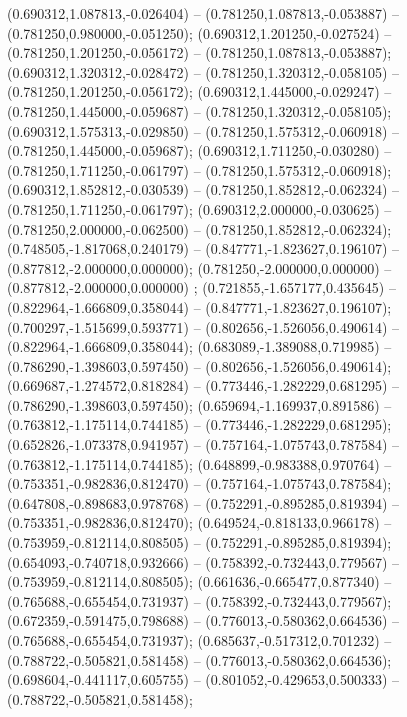  (0.690312,1.087813,-0.026404) -- (0.781250,1.087813,-0.053887) -- (0.781250,0.980000,-0.051250);
 (0.690312,1.201250,-0.027524) -- (0.781250,1.201250,-0.056172) -- (0.781250,1.087813,-0.053887);
 (0.690312,1.320312,-0.028472) -- (0.781250,1.320312,-0.058105) -- (0.781250,1.201250,-0.056172);
 (0.690312,1.445000,-0.029247) -- (0.781250,1.445000,-0.059687) -- (0.781250,1.320312,-0.058105);
 (0.690312,1.575313,-0.029850) -- (0.781250,1.575312,-0.060918) -- (0.781250,1.445000,-0.059687);
 (0.690312,1.711250,-0.030280) -- (0.781250,1.711250,-0.061797) -- (0.781250,1.575312,-0.060918);
 (0.690312,1.852812,-0.030539) -- (0.781250,1.852812,-0.062324) -- (0.781250,1.711250,-0.061797);
 (0.690312,2.000000,-0.030625) -- (0.781250,2.000000,-0.062500) -- (0.781250,1.852812,-0.062324);
 (0.748505,-1.817068,0.240179) -- (0.847771,-1.823627,0.196107) -- (0.877812,-2.000000,0.000000);
 (0.781250,-2.000000,0.000000) -- (0.877812,-2.000000,0.000000) ;
 (0.721855,-1.657177,0.435645) -- (0.822964,-1.666809,0.358044) -- (0.847771,-1.823627,0.196107);
 (0.700297,-1.515699,0.593771) -- (0.802656,-1.526056,0.490614) -- (0.822964,-1.666809,0.358044);
 (0.683089,-1.389088,0.719985) -- (0.786290,-1.398603,0.597450) -- (0.802656,-1.526056,0.490614);
 (0.669687,-1.274572,0.818284) -- (0.773446,-1.282229,0.681295) -- (0.786290,-1.398603,0.597450);
 (0.659694,-1.169937,0.891586) -- (0.763812,-1.175114,0.744185) -- (0.773446,-1.282229,0.681295);
 (0.652826,-1.073378,0.941957) -- (0.757164,-1.075743,0.787584) -- (0.763812,-1.175114,0.744185);
 (0.648899,-0.983388,0.970764) -- (0.753351,-0.982836,0.812470) -- (0.757164,-1.075743,0.787584);
 (0.647808,-0.898683,0.978768) -- (0.752291,-0.895285,0.819394) -- (0.753351,-0.982836,0.812470);
 (0.649524,-0.818133,0.966178) -- (0.753959,-0.812114,0.808505) -- (0.752291,-0.895285,0.819394);
 (0.654093,-0.740718,0.932666) -- (0.758392,-0.732443,0.779567) -- (0.753959,-0.812114,0.808505);
 (0.661636,-0.665477,0.877340) -- (0.765688,-0.655454,0.731937) -- (0.758392,-0.732443,0.779567);
 (0.672359,-0.591475,0.798688) -- (0.776013,-0.580362,0.664536) -- (0.765688,-0.655454,0.731937);
 (0.685637,-0.517312,0.701232) -- (0.788722,-0.505821,0.581458) -- (0.776013,-0.580362,0.664536);
 (0.698604,-0.441117,0.605755) -- (0.801052,-0.429653,0.500333) -- (0.788722,-0.505821,0.581458);
